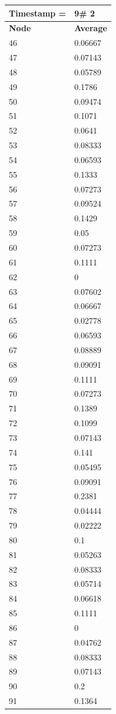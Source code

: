\begin{tabular}{|l||l|}
\hline
\textbf{Timestamp =} & \textbf{9}\# 2\\\hline
	\textbf{Node} & \textbf{Average} \\ \hline
\hline
	46 & 0.06667 \\ \hline
	47 & 0.07143 \\ \hline
	48 & 0.05789 \\ \hline
	49 & 0.1786 \\ \hline
	50 & 0.09474 \\ \hline
	51 & 0.1071 \\ \hline
	52 & 0.0641 \\ \hline
	53 & 0.08333 \\ \hline
	54 & 0.06593 \\ \hline
	55 & 0.1333 \\ \hline
	56 & 0.07273 \\ \hline
	57 & 0.09524 \\ \hline
	58 & 0.1429 \\ \hline
	59 & 0.05 \\ \hline
	60 & 0.07273 \\ \hline
	61 & 0.1111 \\ \hline
	62 & 0 \\ \hline
	63 & 0.07602 \\ \hline
	64 & 0.06667 \\ \hline
	65 & 0.02778 \\ \hline
	66 & 0.06593 \\ \hline
	67 & 0.08889 \\ \hline
	68 & 0.09091 \\ \hline
	69 & 0.1111 \\ \hline
	70 & 0.07273 \\ \hline
	71 & 0.1389 \\ \hline
	72 & 0.1099 \\ \hline
	73 & 0.07143 \\ \hline
	74 & 0.141 \\ \hline
	75 & 0.05495 \\ \hline
	76 & 0.09091 \\ \hline
	77 & 0.2381 \\ \hline
	78 & 0.04444 \\ \hline
	79 & 0.02222 \\ \hline
	80 & 0.1 \\ \hline
	81 & 0.05263 \\ \hline
	82 & 0.08333 \\ \hline
	83 & 0.05714 \\ \hline
	84 & 0.06618 \\ \hline
	85 & 0.1111 \\ \hline
	86 & 0 \\ \hline
	87 & 0.04762 \\ \hline
	88 & 0.08333 \\ \hline
	89 & 0.07143 \\ \hline
	90 & 0.2 \\ \hline
	91 & 0.1364 \\ \hline
\end{tabular}

